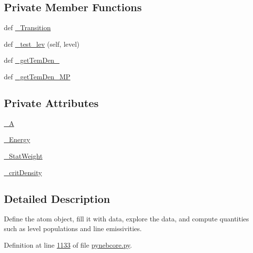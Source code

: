 \subsection*{Private Member Functions}
\begin{DoxyCompactItemize}
\item 
def \hyperlink{classpyneb_1_1core_1_1pynebcore_1_1_atom_a69f29cc10c77910841f9e3ff8ddef250}{\+\_\+\+Transition}
\item 
def \hyperlink{classpyneb_1_1core_1_1pynebcore_1_1_atom_ade3de73e8bdb814d01d2d9af98eba87f}{\+\_\+test\+\_\+lev} (self, level)
\item 
def \hyperlink{classpyneb_1_1core_1_1pynebcore_1_1_atom_ad1d75f64b27a6acee079b5738b69dabe}{\+\_\+get\+Tem\+Den\+\_}
\item 
def \hyperlink{classpyneb_1_1core_1_1pynebcore_1_1_atom_a3a7c4f43d58a5988d04cbe23ed9593ba}{\+\_\+get\+Tem\+Den\+\_\+\+M\+P}
\end{DoxyCompactItemize}
\subsection*{Private Attributes}
\begin{DoxyCompactItemize}
\item 
\hyperlink{classpyneb_1_1core_1_1pynebcore_1_1_atom_aa6416fe661b8deaa008179314727e025}{\+\_\+\+A}
\item 
\hyperlink{classpyneb_1_1core_1_1pynebcore_1_1_atom_a52e68715246d258bf0a14f4bd06e89e4}{\+\_\+\+Energy}
\item 
\hyperlink{classpyneb_1_1core_1_1pynebcore_1_1_atom_a1e76c66b89eb327aeb4cdb1d8bd46fb5}{\+\_\+\+Stat\+Weight}
\item 
\hyperlink{classpyneb_1_1core_1_1pynebcore_1_1_atom_a1d0823a36ca030fd149522fe72908631}{\+\_\+crit\+Density}
\end{DoxyCompactItemize}


\subsection{Detailed Description}
\begin{DoxyVerb}Define the atom object, fill it with data, explore the data, and 
compute quantities such as level populations and line emissivities.\end{DoxyVerb}
 

Definition at line \hyperlink{pynebcore_8py_source_l01133}{1133} of file \hyperlink{pynebcore_8py_source}{pynebcore.\+py}.



